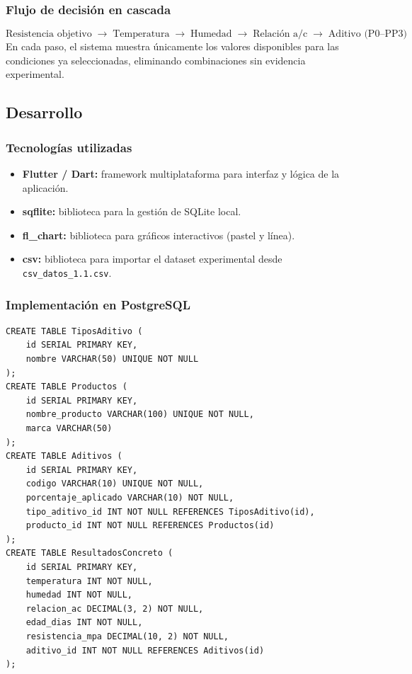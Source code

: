 \documentclass[12pt, letterpaper]{article}
\begin{document}
\subsubsection*{Flujo de decisión en cascada}

\[
\text{Resistencia objetivo} \;\rightarrow\; \text{Temperatura} \;\rightarrow\; \text{Humedad} \;\rightarrow\; \text{Relación a/c} \;\rightarrow\; \text{Aditivo (P0--PP3)}
\]
En cada paso, el sistema muestra únicamente los valores disponibles para las condiciones ya seleccionadas, eliminando combinaciones sin evidencia experimental.

\subsection{Desarrollo}

\subsubsection*{Tecnologías utilizadas}
\begin{itemize}
    \item \textbf{Flutter / Dart:} framework multiplataforma para interfaz y lógica de la aplicación.
    \item \textbf{sqflite:} biblioteca para la gestión de SQLite local.
    \item \textbf{fl\_chart:} biblioteca para gráficos interactivos (pastel y línea).
    \item \textbf{csv:} biblioteca para importar el dataset experimental desde \texttt{csv\_datos\_1.1.csv}.
\end{itemize}

\subsubsection*{Implementación en PostgreSQL}

\begin{lstlisting}[style=sqlstyle, caption=Script DDL para PostgreSQL.]
CREATE TABLE TiposAditivo (
    id SERIAL PRIMARY KEY,
    nombre VARCHAR(50) UNIQUE NOT NULL
);
CREATE TABLE Productos (
    id SERIAL PRIMARY KEY,
    nombre_producto VARCHAR(100) UNIQUE NOT NULL,
    marca VARCHAR(50)
);
CREATE TABLE Aditivos (
    id SERIAL PRIMARY KEY,
    codigo VARCHAR(10) UNIQUE NOT NULL,
    porcentaje_aplicado VARCHAR(10) NOT NULL,
    tipo_aditivo_id INT NOT NULL REFERENCES TiposAditivo(id),
    producto_id INT NOT NULL REFERENCES Productos(id)
);
CREATE TABLE ResultadosConcreto (
    id SERIAL PRIMARY KEY,
    temperatura INT NOT NULL,
    humedad INT NOT NULL,
    relacion_ac DECIMAL(3, 2) NOT NULL,
    edad_dias INT NOT NULL,
    resistencia_mpa DECIMAL(10, 2) NOT NULL,
    aditivo_id INT NOT NULL REFERENCES Aditivos(id)
);
\end{lstlisting}
\end{document}
